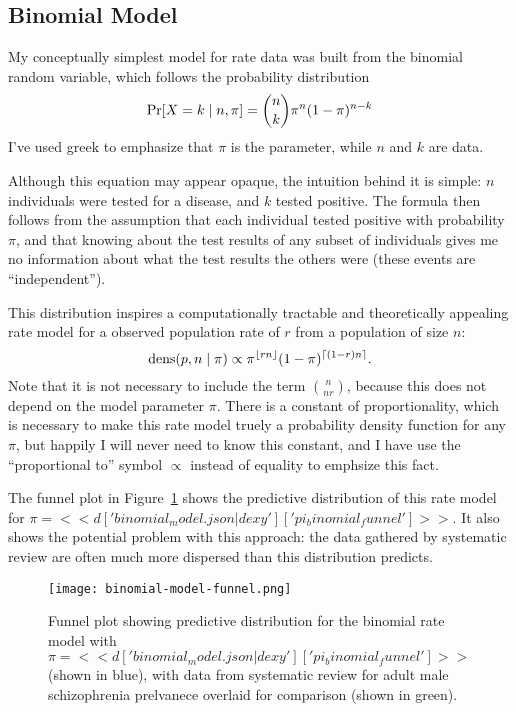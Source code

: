 \subsection{Binomial Model}
My conceptually simplest model for rate data was built from the
binomial random variable, which follows the probability distribution
\[
\operatorname{Pr}[X=k\;|\; n,\pi] = \binom{n}{k}\pi^n(1-\pi)^{n-k}
\]
I've used greek to emphasize that $\pi$ is the parameter, while $n$
and $k$ are data.

Although this equation may appear opaque, the intuition behind it is
simple: $n$ individuals were tested for a disease, and $k$ tested
positive. The formula then follows from the assumption that each
individual tested positive with probability $\pi$, and that 
knowing about the test results of any subset of individuals gives me
no information about what the test results the others were
(these events are ``independent'').

This distribution inspires a computationally tractable and
theoretically appealing rate model for a observed population rate of
$r$ from a population of size $n$:
\[
\operatorname{dens}(p,n\;|\; \pi) \propto \pi^{\lfloor rn \rfloor}(1-\pi)^{\lceil (1-r)n \rceil}.
\]
Note that it is not necessary to include the term $\binom{n}{nr}$,
because this does not depend on the model parameter $\pi$. There is a
constant of proportionality, which is necessary to make this rate
model truely a probability density function for any $\pi$, but happily
I will never need to know this constant, and I have use the ``proportional to''
symbol $\propto$ instead of equality to emphsize this fact.

The funnel plot in Figure~\ref{fig:theory-rate_model-binom_funnel}
shows the predictive distribution of this rate model for $\pi=<<
d['binomial_model.json|dexy']['pi_binomial_funnel'] >>$.  It also shows
the potential problem with this approach: the data gathered by
systematic review are often much more dispersed than this
distribution predicts.

\begin{figure}[ht]
\begin{center}
\texttt{[image: binomial-model-funnel.png]}
\end{center}
\caption{Funnel plot showing predictive distribution for the binomial
  rate model with
  $\pi=<<d['binomial_model.json|dexy']['pi_binomial_funnel']>>$ (shown in
  blue), with data from systematic review for adult male schizophrenia
  prelvanece overlaid for comparison (shown in green).}
\label{fig:theory-rate_model-binom_funnel}
\end{figure}


